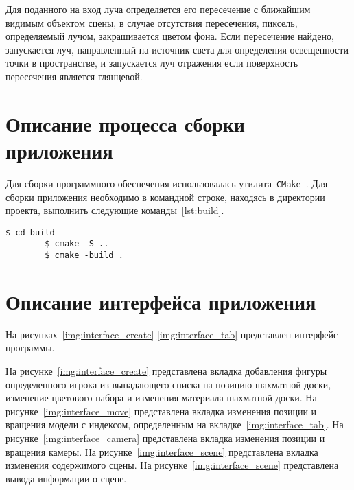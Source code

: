 Для поданного на вход луча определяется его пересечение с ближайшим видимым объектом сцены, в случае отсутствия пересечения, пиксель, определяемый лучом, закрашивается цветом фона. Если пересечение найдено, запускается луч, направленный на источник света для определения освещенности точки в пространстве, и запускается луч отражения если поверхность пересечения является глянцевой.

\clearpage
\section{Описание процесса сборки приложения}
Для сборки программного обеспечения использовалась утилита~\texttt{CMake}~\cite{cmake}. Для сборки приложения необходимо в командной строке, находясь в директории проекта, выполнить следующие команды~\ref{lst:build}.

\begin{center}
	\captionsetup{justification=raggedright,singlelinecheck=off}
	\renewcommand{\lstlistingname}{Листинг}
	\begin{lstlisting}[label=lst:build, caption=Сборка программного обеспечения]
		$ cd build
		$ cmake -S ..
		$ cmake -build .
	\end{lstlisting}
\end{center}
\clearpage

\section{Описание интерфейса приложения}
На рисунках~\ref{img:interface_create}-\ref{img:interface_tab} представлен интерфейс программы. 

На рисунке~\ref{img:interface_create} представлена вкладка добавления фигуры определенного игрока из выпадающего списка на позицию шахматной доски, изменение цветового набора и изменения материала шахматной доски. На рисунке~\ref{img:interface_move} представлена вкладка изменения позиции и вращения модели с индексом, определенным на вкладке~\ref{img:interface_tab}. На рисунке~\ref{img:interface_camera} представлена вкладка изменения позиции и вращения камеры. На рисунке~\ref{img:interface_scene} представлена вкладка изменения содержимого сцены. На рисунке~\ref{img:interface_scene} представлена вывода информации о сцене.

\FloatBarrier
{}
\FloatBarrier
{}
\FloatBarrier
{}
\FloatBarrier
{}
\FloatBarrier
{}
\FloatBarrier

